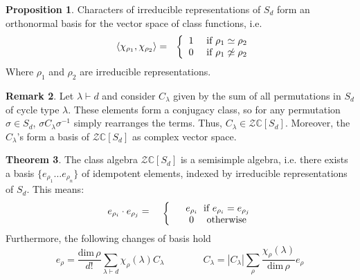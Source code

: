 \documentclass[12pt,a4paper,openright,twoside]{report}
\theoremstyle{definition} %
\newtheorem{theorem}{Theorem}[chapter]
\newtheorem{proposition}[theorem]{Proposition}
\newtheorem{remark}[theorem]{Remark}
\def \C {\mathbb{C}}
\def \ZZ {\mathcal{Z}}
\begin{document}
\begin{proposition}
    Characters of irreducible representations of \(S_d\) form an orthonormal basis for the vector space of class functions, i.e.
    \[
        \parbox{2.5cm}{\centering \(\langle \chi_{\rho_1}, \chi_{\rho_2} \rangle =\)}
        \biggl\{
        \parbox{2.5cm}{\centering \(1 \quad\) if \(\rho_1 \simeq \rho_2\) \\
        \(0 \quad\) if \(\rho_1 \not \simeq \rho_2\)}
    \]
    Where \(\rho_1\) and \(\rho_2\) are irreducible representations.
\end{proposition}

\begin{remark}
    Let \(\lambda \vdash d\) and consider \(C_{\lambda}\) given by the sum of all permutations in \(S_d\) of cycle type \(\lambda\). These elements form a conjugacy class, so for any permutation \(\sigma \in S_d\), \(\sigma C_{\lambda} \sigma^{-1}\) simply rearranges the terms. Thus, \(C_{\lambda} \in \ZZ \C[S_d]\).
    Moreover, the \(C_{\lambda}\)'s form a basis of \(\ZZ \C[S_d]\) as complex vector space.
\end{remark}

\begin{theorem}\label{maschke}
    The class algebra \(\ZZ \C[S_d]\) is a semisimple algebra, i.e. there exists a basis \(\{e_{\rho_1} \ldots e_{\rho_n}\}\) of idempotent elements, indexed by irreducible representations of \(S_d\). This means:
            \[
        \parbox{2.5cm}{\centering \(e_{\rho_i} \cdot e_{\rho_j} =\)}
        \biggl\{
        \parbox{3.5cm}{\centering \(e_{\rho_i} \;\) if \(e_{\rho_i} = e_{\rho_j}\) \\
        \(0 \quad\) otherwise}
    \]
    Furthermore, the following changes of basis hold
    \[
    e_{\rho} = \frac{\text{dim} \, \rho}{d!} \sum_{\lambda \vdash d}\chi_{\rho}(\lambda)C_{\lambda}
    \qquad \qquad
    C_{\lambda} = |C_{\lambda}| \sum_{\rho} \frac{\chi_{\rho}(\lambda)}{\text{dim} \, \rho}e_{\rho}
    \]
\end{theorem}
\end{document}
